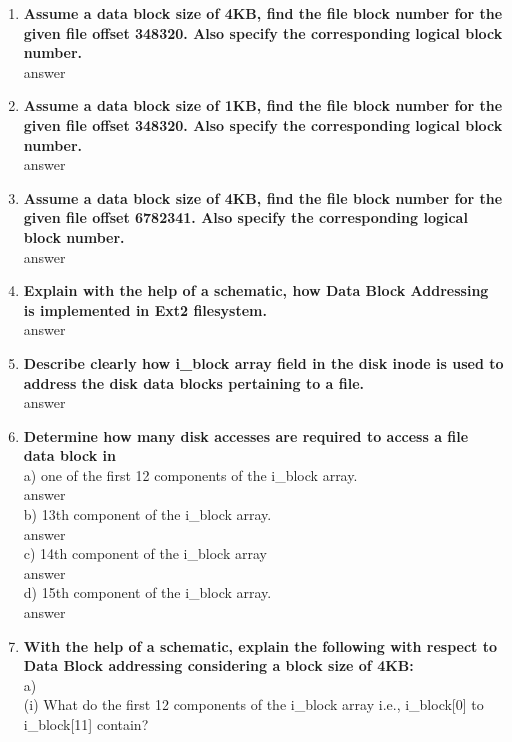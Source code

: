 \documentclass[a4paper,12pt]{article}
\begin{document}
\begin{flushleft}
\begin{enumerate}
\item \textbf{ Assume a data block size of 4KB, find the file block number for the given file offset 348320. Also specify the corresponding logical block number.}\\
{\color{red}answer}\\
\item \textbf{ Assume a data block size of 1KB, find the file block number for the given file offset 348320. Also specify the corresponding logical block number.}\\
{\color{red}answer}\\
\item \textbf{ Assume a data block size of 4KB, find the file block number for the given file offset 6782341. Also specify the corresponding logical block number.}\\
{\color{red}answer}\\
\item \textbf{ Explain with the help of a schematic, how Data Block Addressing is implemented in Ext2 filesystem.}\\
{\color{red}answer}\\
\item \textbf{ Describe clearly how i\_block array field in the disk inode is used to address the disk data blocks pertaining to a file.}\\
{\color{red}answer}\\
\item \textbf{ Determine how many disk accesses are required to access a file data block in}\\
a) one of the first 12 components of the i\_block array.\\
{\color{red}answer}\\
b) 13th component of the i\_block array.\\
{\color{red}answer}\\
c) 14th component of the i\_block array\\
{\color{red}answer}\\
d) 15th component of the i\_block array.\\
{\color{red}answer}\\
\item \textbf{ With the help of a schematic, explain the following with respect to Data Block addressing considering a block size of 4KB:}\\
a)\\ (i) What do the first 12 components of the i\_block array i.e., i\_block[0] to i\_block[11] contain?\\

\end{enumerate}
\end{flushleft}
\end{document}

